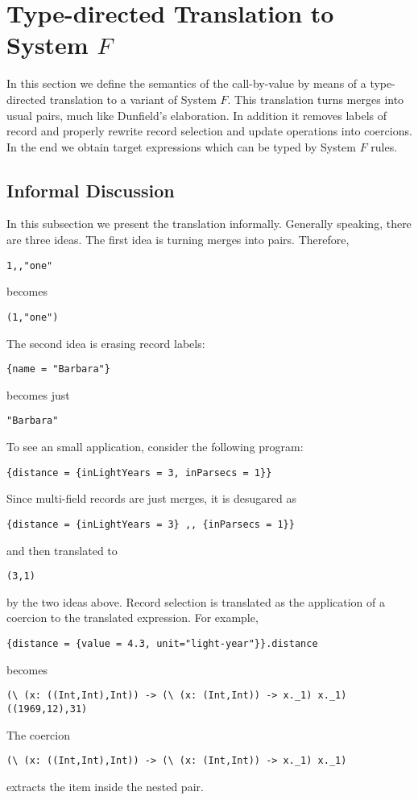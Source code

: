\section{Type-directed Translation to System $ F $}

In this section we define the semantics of the call-by-value \name by means of a
type-directed translation to a variant of System $F$. This translation turns
merges into usual pairs, much like Dunfield's elaboration. In addition it
removes labels of record and properly rewrite record selection and update
operations into coercions. In the end we obtain target expressions which can be
typed by System $F$ rules.

\subsection{Informal Discussion}

In this subsection we present the translation informally. Generally speaking,
there are three ideas. The first idea is turning merges into pairs. Therefore,
\begin{lstlisting}
1,,"one"
\end{lstlisting}
becomes
\begin{lstlisting}
(1,"one")
\end{lstlisting}
The second idea is erasing record labels:
\begin{lstlisting}
{name = "Barbara"}
\end{lstlisting}
becomes just
\begin{lstlisting}
"Barbara"
\end{lstlisting}
To see an small application, consider the following program:
\begin{lstlisting}
{distance = {inLightYears = 3, inParsecs = 1}}
\end{lstlisting}
Since multi-field records are just merges, it is desugared as
\begin{lstlisting}
{distance = {inLightYears = 3} ,, {inParsecs = 1}}
\end{lstlisting}
and then translated to
\begin{lstlisting}
(3,1)
\end{lstlisting}
by the two ideas above. Record selection is translated as the application of a
coercion to the translated expression. For example,
\begin{lstlisting}
{distance = {value = 4.3, unit="light-year"}}.distance
\end{lstlisting}
becomes
\begin{lstlisting}
(\ (x: ((Int,Int),Int)) -> (\ (x: (Int,Int)) -> x._1) x._1) ((1969,12),31)
\end{lstlisting}
The coercion 
\begin{lstlisting}
(\ (x: ((Int,Int),Int)) -> (\ (x: (Int,Int)) -> x._1) x._1) 
\end{lstlisting}
extracts the item inside the nested pair.


